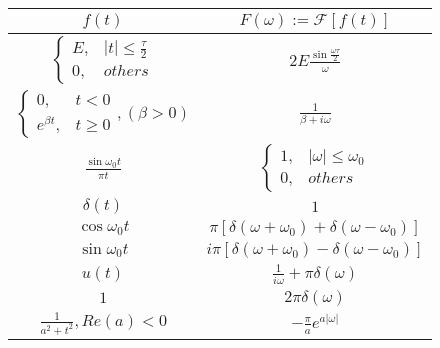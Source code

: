 \documentclass[UTF8, 12pt]{ctexart}
\begin{document}
	\begin{table}[ht]
		\begin{tabular}{|c|c|}
			\hline
			$ f(t)$ & $ F(\omega) := \mathscr{F}[f(t)]$ \\ \hline
			$ \begin{cases} E,& |t| \leq \frac{\tau}{2} \\ 0,& others \end{cases} $ & $ 2E\frac{\sin\frac{\omega\tau}{2}}{\omega} $ \\ \hline
			$ \begin{cases} 0,& t < 0 \\ e^{\beta t},& t \geq 0 \end{cases}, (\beta > 0) $ & $ \frac{1}{\beta+i\omega} $ \\ \hline
			$ \frac{\sin\omega_0t}{\pi t} $ & $ \begin{cases} 1,& |\omega| \leq \omega_0 \\ 0,& others \end{cases} $ \\ \hline
			$ \delta(t) $ & $ 1 $ \\ \hline
			$ \cos\omega_0t $ & $ \pi[\delta(\omega+\omega_0) + \delta(\omega-\omega_0)] $ \\ \hline
			$ \sin\omega_0t $ & $ i\pi[\delta(\omega+\omega_0) - \delta(\omega-\omega_0)] $ \\ \hline
			$ u(t) $ & $ \frac{1}{i\omega} + \pi\delta(\omega) $ \\ \hline
			$ 1 $ & $ 2\pi\delta(\omega) $ \\ \hline
			$ \frac{1}{a^{2}+t^{2}}, Re(a) < 0$ & $ -\frac{\pi}{a}e^{a|\omega|} $ \\ \hline
		\end{tabular}
	\end{table}
\end{document}
